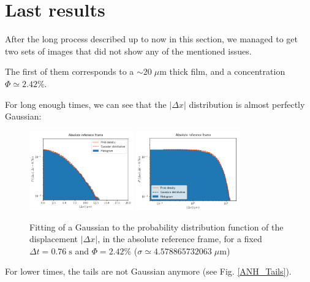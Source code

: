 \section{Last results}

After the long process described up to now in this section, we managed to get two sets of images that did not show any of the mentioned issues.

The first of them corresponds to a $\sim 20 \; \mu \textrm{m}$ thick film, and a concentration $\Phi \simeq 2.42\%$.

For long enough times, we can see that the $|\Delta x|$ distribution is almost perfectly Gaussian:

\begin{figure}[H]
	\centering
	\includegraphics[width=0.4\textwidth]{archivos/GaussXpdf_ylog_Dt076_ANH_Chlamy_beads_Thickness18pt_60x.png}
	\includegraphics[width=0.4\textwidth]{archivos/GaussXpdf_loglog_Dt076_ANH_Chlamy_beads_Thickness18pt_60x.png}
	\caption{Fitting of a Gaussian to the probability distribution function of the displacement $|\Delta x|$, in the absolute reference frame, for a fixed $\Delta t = 0.76 \; \textrm{s}$ and $\Phi = 2.42\%$ ($\sigma \simeq 4.578865732063 \; \mu \textrm{m}$)}
	\label{ANH_Gauss_X}
\end{figure}

For lower times, the tails are not Gaussian anymore (see Fig. \ref{ANH_Tails}).


